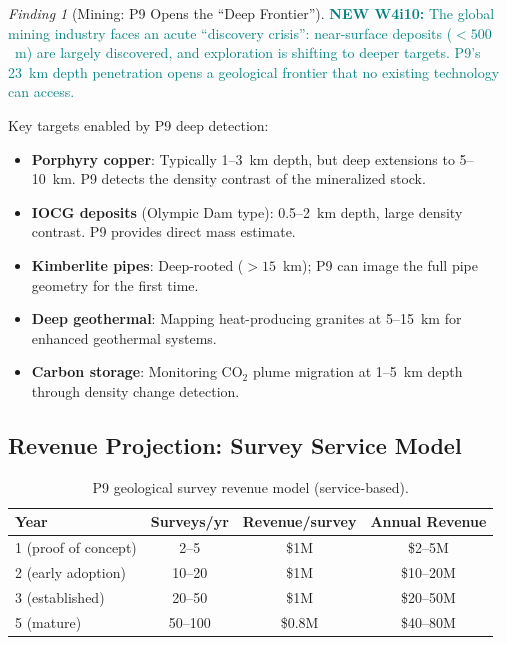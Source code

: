 \documentclass[11pt]{article}
\theoremstyle{definition}
\theoremstyle{remark}
\newtheorem{finding}[theorem]{Finding}
\newcommand{\newfinding}[1]{\textcolor{teal}{\textbf{NEW W4i10:} #1}}
\begin{document}
\begin{finding}[Mining: P9 Opens the ``Deep Frontier'']
\label{find:mining-deep}
\newfinding{The global mining industry faces an acute ``discovery crisis'':
near-surface deposits ($<500$~m) are largely discovered, and exploration
is shifting to deeper targets. P9's 23~km depth penetration opens a
geological frontier that no existing technology can access.}

Key targets enabled by P9 deep detection:
\begin{itemize}[nosep]
\item \textbf{Porphyry copper}: Typically 1--3~km depth, but deep extensions
  to 5--10~km. P9 detects the density contrast of the mineralized stock.
\item \textbf{IOCG deposits} (Olympic Dam type): 0.5--2~km depth, large
  density contrast. P9 provides direct mass estimate.
\item \textbf{Kimberlite pipes}: Deep-rooted ($>15$~km); P9 can image the
  full pipe geometry for the first time.
\item \textbf{Deep geothermal}: Mapping heat-producing granites at 5--15~km
  for enhanced geothermal systems.
\item \textbf{Carbon storage}: Monitoring CO$_2$ plume migration at 1--5~km
  depth through density change detection.
\end{itemize}
\end{finding}

\subsection{Revenue Projection: Survey Service Model}

\begin{table}[H]
\centering
\caption{P9 geological survey revenue model (service-based).}
\label{tab:mining-revenue}
\begin{tabular}{@{}lccc@{}}
\toprule
Year & Surveys/yr & Revenue/survey & Annual Revenue \\
\midrule
1 (proof of concept) & 2--5 & \$1M & \$2--5M \\
2 (early adoption) & 10--20 & \$1M & \$10--20M \\
3 (established) & 20--50 & \$1M & \$20--50M \\
5 (mature) & 50--100 & \$0.8M & \$40--80M \\
\bottomrule
\end{tabular}
\end{table}
\end{document}
